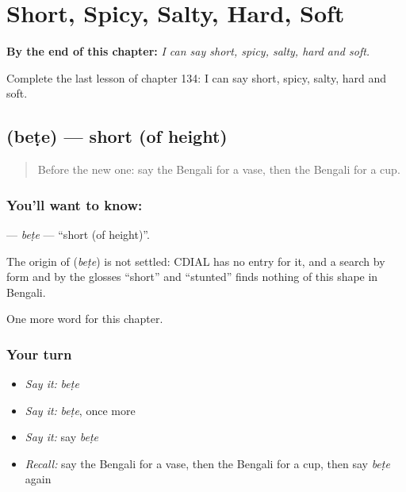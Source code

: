 
\chapter{Short, Spicy, Salty, Hard, Soft}
\label{ch:bn-short-spicy-salty-hard-soft}

\begin{chapteropening}
\textbf{By the end of this chapter:} \emph{I can say short, spicy, salty, hard and soft.}

Complete the last lesson of chapter 134: I can say short, spicy, salty, hard and soft.
\end{chapteropening}

\section[\texorpdfstring{\bn{বেঁটে} (beṭe)}{বেঁটে (beṭe)}]{ (beṭe) — short (of height)}

\label{lesson:BN-C134-bete}



\begin{quote}
Before the new one: say the Bengali for a vase, then the Bengali for a cup.
\end{quote}

\subsection*{You'll want to know: }
\textbf{} — \emph{beṭe} — \textquotedblleft{}short (of height)\textquotedblright{}.

\begin{cousinweb}
The origin of \textbf{} (\emph{beṭe}) is not settled: CDIAL has no entry for it, and a search by form and by the glosses \textquotedblleft{}short\textquotedblright{} and \textquotedblleft{}stunted\textquotedblright{} finds nothing of this shape in Bengali.
\end{cousinweb}

\begin{grammarlens}[title={What you've built}]
One more word for this chapter.
\end{grammarlens}

\subsection*{Your turn}
\begin{itemize}
\raggedright
  \item \emph{Say it:} \emph{beṭe}
  \item \emph{Say it:} \emph{beṭe}, once more
  \item \emph{Say it:} say \emph{beṭe}
  \item \emph{Recall:} say the Bengali for a vase, then the Bengali for a cup, then say \emph{beṭe} again
\end{itemize}

